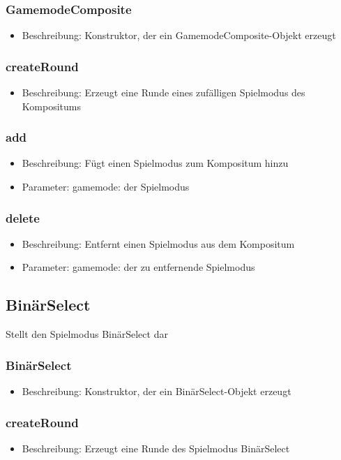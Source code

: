 \documentclass[a4paper]{scrreprt}
\begin{document}
	\subsubsection{GamemodeComposite}
		\begin{itemize}
		\item Beschreibung: Konstruktor, der ein GamemodeComposite-Objekt erzeugt	
		\end{itemize}
	\subsubsection{createRound}
	\begin{itemize}
		\item Beschreibung: Erzeugt eine Runde eines zufälligen Spielmodus des Kompositums
	\end{itemize}
	\subsubsection{add}
	\begin{itemize}
		\item Beschreibung: Fügt einen Spielmodus zum Kompositum hinzu
		\item Parameter: gamemode: der Spielmodus
	\end{itemize}
	\subsubsection{delete}
	\begin{itemize}
		\item Beschreibung: Entfernt einen Spielmodus aus dem Kompositum
		\item Parameter: gamemode: der zu entfernende Spielmodus
	\end{itemize}
	
	\subsection{BinärSelect}
	Stellt den Spielmodus BinärSelect dar
	\subsubsection{BinärSelect}
		\begin{itemize}
		\item Beschreibung: Konstruktor, der ein BinärSelect-Objekt erzeugt 	
		\end{itemize}
	\subsubsection{createRound}
	\begin{itemize}
		\item Beschreibung: Erzeugt eine Runde des Spielmodus BinärSelect
	\end{itemize}
	
\end{document}
